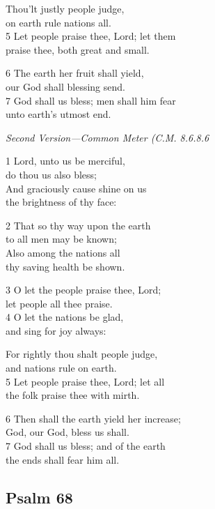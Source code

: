 \begin{multicols}{3}
Thou’lt justly people judge,\\
on earth rule nations all.\\
5 Let people praise thee, Lord; let them\\
praise thee, both great and small.

6 The earth her fruit shall yield,\\
our God shall blessing send.\\
7 God shall us bless; men shall him fear\\
unto earth’s utmost end.

\emph{Second Version---Common Meter (C.M. 8.6.8.6}

1 Lord, unto us be merciful,\\
do thou us also bless;\\
And graciously cause shine on us\\
the brightness of thy face:

2 That so thy way upon the earth\\
to all men may be known;\\
Also among the nations all\\
thy saving health be shown.

3 O let the people praise thee, Lord;\\
let people all thee praise.\\
4 O let the nations be glad,\\
and sing for joy always:

For rightly thou shalt people judge,\\
and nations rule on earth.\\
5 Let people praise thee, Lord; let all\\
the folk praise thee with mirth.

6 Then shall the earth yield her increase;\\
God, our God, bless us shall.\\
7 God shall us bless; and of the earth\\
the ends shall fear him all.

\begin{center}
\quad{}\quad{}
\end{center}

\subsection*{Psalm 68}


\end{multicols}
